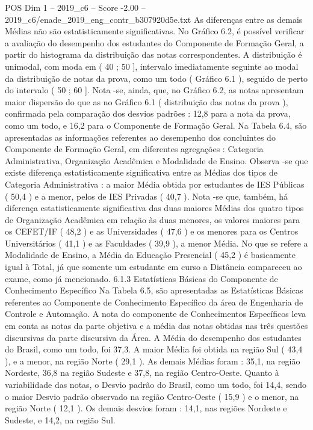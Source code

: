 \begin{textsample}{POS Dim 1 – 2019\_c6 – Score -2.00 – 2019\_c6/enade\_2019\_eng\_contr\_b307920d5e.txt}
As diferenças entre as demais Médias não são estatisticamente significativas.
No Gráfico 6.2, é possível verificar a avaliação do desempenho dos estudantes do Componente de Formação Geral, a partir do histograma da distribuição das notas correspondentes.
A distribuição é unimodal, com moda em ( 40 ; 50 ], intervalo imediatamente seguinte ao modal da distribuição de notas da prova, como um todo ( Gráfico 6.1 ), seguido de perto do intervalo ( 50 ; 60 ].
Nota -se, ainda, que, no Gráfico 6.2, as notas apresentam maior dispersão do que as no Gráfico 6.1 ( distribuição das notas da prova ), confirmada pela comparação dos desvios padrões : 12,8 para a nota da prova, como um todo, e 16,2 para o Componente de Formação Geral.
Na Tabela 6.4, são apresentadas as informações referentes ao desempenho dos concluintes do Componente de Formação Geral, em diferentes agregações : Categoria Administrativa, Organização Acadêmica e Modalidade de Ensino.
Observa -se que existe diferença estatisticamente significativa entre as Médias dos tipos de Categoria Administrativa : a maior Média obtida por estudantes de IES Públicas ( 50,4 ) e a menor, pelos de IES Privadas ( 40,7 ).
Nota -se que, também, há diferença estatisticamente significativa das duas maiores Médias dos quatro tipos de Organização Acadêmica em relação às duas menores, os valores maiores para os CEFET/IF ( 48,2 ) e as Universidades ( 47,6 ) e os menores para os Centros Universitários ( 41,1 ) e as Faculdades ( 39,9 ), a menor Média.
No que se refere a Modalidade de Ensino, a Média da Educação Presencial ( 45,2 ) é basicamente igual à Total, já que somente um estudante em curso a Distância compareceu ao exame, como já mencionado. 6.1.3 Estatísticas Básicas do Componente de Conhecimento Específico Na Tabela 6.5, são apresentadas as Estatísticas Básicas referentes ao Componente de Conhecimento Específico da área de Engenharia de Controle e Automação.
A nota do componente de Conhecimentos Específicos leva em conta as notas da parte objetiva e a média das notas obtidas nas três questões discursivas da parte discursiva da Área.
A Média do desempenho dos estudantes do Brasil, como um todo, foi 37,3.
A maior Média foi obtida na região Sul ( 43,4 ), e a menor, na região Norte ( 29,1 ).
As demais Médias foram : 35,1, na região Nordeste, 36,8 na região Sudeste e 37,8, na região Centro-Oeste.
Quanto à variabilidade das notas, o Desvio padrão do Brasil, como um todo, foi 14,4, sendo o maior Desvio padrão observado na região Centro-Oeste ( 15,9 ) e o menor, na região Norte ( 12,1 ).
Os demais desvios foram : 14,1, nas regiões Nordeste e Sudeste, e 14,2, na região Sul.

\end{textsample}
